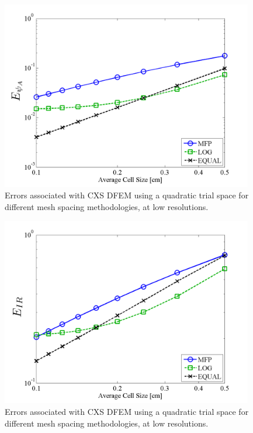 \begin{figure}[!htp]
\centering
\includegraphics[width=11cm]{chapter3_variable_xs/LOW_RES_P2_CXS_E_PSI_A.png}
\caption{Errors associated with CXS DFEM using a quadratic trial space  for different mesh spacing methodologies, at low resolutions.}
\label{fig:low_res_cxs_psi_A}
\end{figure}
%
\begin{figure}[!hbp]
\centering
\includegraphics[width=11cm]{chapter3_variable_xs/LOW_RES_P2_CXS_E_IR.png}
\caption{Errors associated with CXS DFEM using a quadratic trial space  for different mesh spacing methodologies, at low resolutions.}
\label{fig:low_res_cxs_ir}
\end{figure}
%
